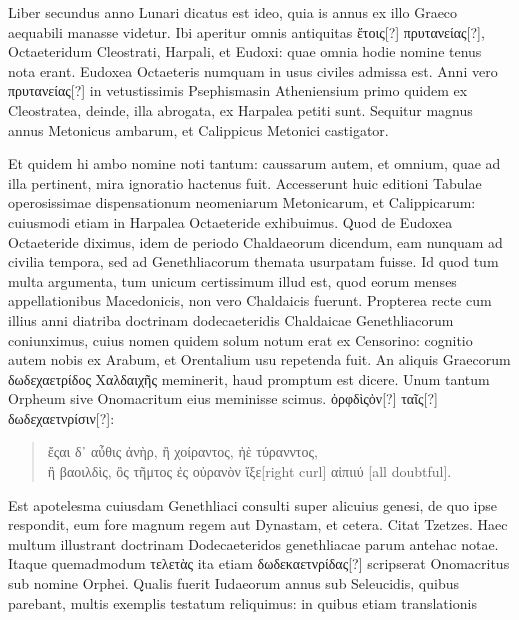 Liber secundus anno Lunari dicatus est ideo, quia is annus ex illo
Graeco aequabili manasse videtur.
Ibi aperitur omnis antiquitas \textgreek{ἔτοις[?]
πρυτανείας[?]}, Octaeteridum Cleostrati, Harpali, et Eudoxi: quae omnia
hodie nomine tenus nota erant.
Eudoxea Octaeteris numquam
in usus civiles admissa est.
Anni vero \textgreek{πρυτανείας[?]} in vetustissimis Psephismasin
Atheniensium primo quidem ex Cleostratea, deinde, illa
abrogata, ex Harpalea petiti sunt.
Sequitur magnus annus Metonicus
ambarum, et Calippicus Metonici castigator.

Et quidem hi
ambo nomine noti tantum: caussarum autem, et omnium, quae ad
illa pertinent, mira ignoratio hactenus fuit.
Accesserunt huic editioni
Tabulae operosissimae dispensationum neomeniarum Metonicarum,
et Calippicarum: cuiusmodi etiam in Harpalea Octaeteride
exhibuimus. 
Quod de Eudoxea Octaeteride diximus, idem de
periodo Chaldaeorum dicendum, eam nunquam ad civilia tempora,
sed ad Genethliacorum themata usurpatam fuisse.
Id quod tum
multa argumenta, tum unicum certissimum illud est, quod eorum
menses appellationibus Macedonicis, non vero Chaldaicis fuerunt.
Propterea recte cum illius anni diatriba doctrinam dodecaeteridis
Chaldaicae Genethliacorum coniunximus, cuius nomen quidem
solum notum erat ex Censorino: cognitio autem nobis ex Arabum,
et Orentalium usu repetenda fuit.
An aliquis Graecorum \textgreek{δωδεχαετρίδος Χαλδαιχῆς}
meminerit, haud promptum est dicere.
Unum tantum Orpheum sive Onomacritum eius meminisse scimus. 
\textgreek{ὀρφδὶςὀν[?] ταῖς[?] δωδεχαετνρίσιν[?]:}
\begin{quote}
\begin{greek}
ἔςαι δ᾽ αὖθις ἀνὴρ, ἢ χοίραντος, ἠὲ τύρανντος,\\
ἢ βαοιλδὶς, ὂς τῆμτος ἐς οὐρανὸν ἴξε[right curl] αἰπιιύ
 [all doubtful].
\end{greek}
\end{quote}
Est apotelesma cuiusdam Genethliaci consulti super alicuius genesi,
de quo ipse respondit, eum fore magnum regem aut Dynastam, et cetera.
Citat Tzetzes. 
Haec multum illustrant doctrinam Dodecaeteridos
genethliacae parum antehac notae.
Itaque quemadmodum \textgreek{τελετὰς}
ita etiam \textgreek{δωδεκαετνρίδας[?]} scripserat Onomacritus sub nomine
Orphei.
Qualis fuerit Iudaeorum annus sub Seleucidis, quibus parebant,
multis exemplis testatum reliquimus: in quibus etiam translationis
